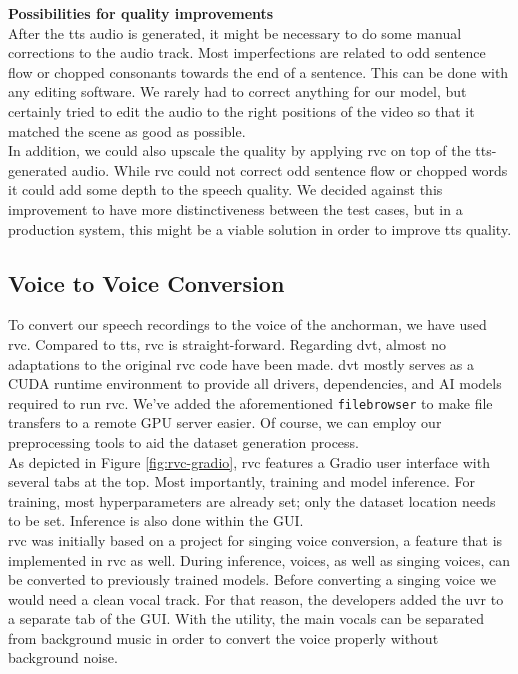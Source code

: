 \documentclass[
  a4paper,  %
  twoside,  %
  bibliography=totoc,
  headsepline,
  cleardoublepage=empty,
  parskip=half,
  draft=false
]{scrbook}
\begin{document}
\textbf{Possibilities for quality improvements} \\
After the \gls{tts} audio is generated, it might be necessary to do some manual corrections to the audio track. Most imperfections are related to odd sentence flow or chopped consonants towards the end of a sentence. This can be done with any editing software. We rarely had to correct anything for our model, but certainly tried to edit the audio to the right positions of the video so that it matched the scene as good as possible. \\
In addition, we could also upscale the quality by applying \gls{rvc} on top of the \gls{tts}-generated audio. While \gls{rvc} could not correct odd sentence flow or chopped words it could add some depth to the speech quality. We decided against this improvement to have more distinctiveness between the test cases, but in a production system, this might be a viable solution in order to improve \gls{tts} quality. 

\subsection{Voice to Voice Conversion}
To convert our speech recordings to the voice of the anchorman, we have used \gls{rvc}. Compared to \gls{tts}, \gls{rvc} is straight-forward. Regarding \gls*{dvt}, almost no adaptations to the original \gls*{rvc} \cite*{RVCProjectRetrievalbasedVoiceConversionWebUI2023} code have been made. \gls*{dvt} mostly serves as a CUDA runtime environment to provide all drivers, dependencies, and AI models required to run \gls{rvc}. We've added the aforementioned \verb|filebrowser| to make file transfers to a remote GPU server easier. Of course, we can employ our preprocessing tools to aid the dataset generation process.\\
As depicted in Figure \ref{fig:rvc-gradio}, \gls{rvc} features a Gradio user interface with several tabs at the top. Most importantly, training and model inference. For training, most hyperparameters are already set; only the dataset location needs to be set. Inference is also done within the GUI. \\
\gls{rvc} was initially based on a project for singing voice conversion, a feature that is implemented in \gls{rvc} as well. During inference, voices, as well as singing voices, can be converted to previously trained models. Before converting a singing voice we would need a clean vocal track. For that reason, the developers added the \gls{uvr} to a separate tab of the GUI. With the utility, the main vocals can be separated from background music in order to convert the voice properly without background noise.
\end{document}
